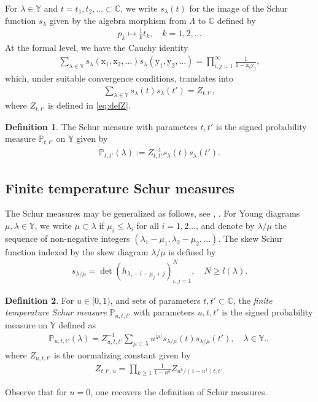 \documentclass[12pt]{amsart}
\theoremstyle{definition}
\newtheorem{defi}{Definition}[section]
\renewcommand{\P}{\mathbb{P}}
\newcommand{\C}{\mathbb{C}}
\newcommand{\Y}{\mathbb{Y}}
\begin{document}
For $\lambda \in \Y$ and $t=t_1,t_2,\dots \subset \C$, we write $s_\lambda(t)$ for the image of the Schur function $s_\lambda$ given by the algebra morphism from $\Lambda$ to $\C$ defined by
\begin{align*}
p_k \mapsto \frac{1}{k}t_k, \quad k=1,2, \dots
\end{align*}
At the formal level, we have the Cauchy identity
\begin{align*}
    \sum_{ \lambda \in \Y} s_\lambda(\mathrm{x}_1,\mathrm{x}_2,\dots) s_\lambda(\mathrm{y}_1,\mathrm{y}_2,\dots) = \prod_{i,j=1}^{\infty} \frac{1}{1-\mathrm{x}_i\mathrm{y}_j},
\end{align*}
which, under suitable convergence conditions, translates into
\begin{align*}
    \sum_{\lambda \in \Y} s_\lambda(t)s_\lambda(t')=Z_{t,t'},
\end{align*}
where $Z_{t,t'}$ is defined in \eqref{eq:defZ}.
\begin{defi}The Schur measure with parameters $t, t'$ is the signed probability measure $\P_{t,t'}$ on $\Y$ given by
\begin{align*}
\P_{t,t'}(\lambda) := Z_{t,t'}^{-1} s_\lambda(t) s_\lambda(t').
\end{align*}
\end{defi}
\subsection{Finite temperature Schur measures}
The Schur measures may be generalized as follows, see \cite{borodinperiodic}, \cite{beteabouttier}. For Young diagrams $\mu, \lambda \in \Y$, we write $\mu \subset \lambda$ if $\mu_i \leq \lambda_i$ for all $i=1,2 \dots$, and denote by $\lambda / \mu$ the sequence of non-negative integers $(\lambda_1 - \mu_1, \lambda_2 - \mu_2,\dots)$. The skew Schur function indexed by the skew diagram $\lambda / \mu$ is defined by
\begin{align*}
s_{\lambda / \mu} = \det ( h_{ \lambda_i - i - \mu_j + j} )_{i,j =1}^N, \quad N \geq l(\lambda).
\end{align*}
\begin{defi}For $u \in [0,1)$, and sets of parameters $t,t' \subset \C$, the \emph{finite temperature Schur measure} $\P_{u,t,t'}$  with parameters $u,t,t'$ is the signed probability measure on $\Y$ defined as
\begin{align*}
\P_{u,t,t'}(\lambda)= Z_{u,t,t'}^{-1} \sum_{  \mu \subset \lambda} u^{|\mu|} s_{\lambda/ \mu}(t) s_{\lambda /  \mu} (t') , \quad \lambda \in \Y.,
\end{align*}
where $Z_{u,t,t'}$ is the normalizing constant given by
\begin{align*}
    Z_{t,t',u}=\prod_{k \geq 1} \frac{1}{1-u^k}Z_{u^k/(1-u^k)t,t'.}
\end{align*}
\end{defi}
Observe that for $u=0$, one recovers the definition of Schur measures.
\end{document}
